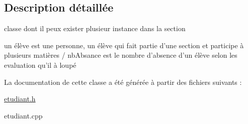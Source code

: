 \subsection{Description détaillée}
classe dont il peux exister plusieur instance dans la section 

un élève est une personne, un élève qui fait partie d'une section et participe à plusieurs matières / nb\+Absance est le nombre d'absence d'un élève selon les evaluation qu'il à loupé 

La documentation de cette classe a été générée à partir des fichiers suivants \+:\begin{DoxyCompactItemize}
\item 
\hyperlink{etudiant_8h}{etudiant.\+h}\item 
etudiant.\+cpp\end{DoxyCompactItemize}
